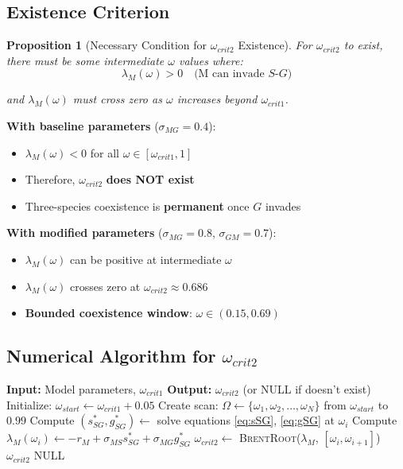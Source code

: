 \documentclass[11pt]{article}
\newtheorem{proposition}{Proposition}
\begin{document}
\subsection{Existence Criterion}

\begin{proposition}[Necessary Condition for $\omega_{crit2}$ Existence]
For $\omega_{crit2}$ to exist, there must be some intermediate $\omega$ values where:
\begin{equation}
\lambda_M(\omega) > 0 \quad \text{(M can invade $S$-$G$)}
\end{equation}

and $\lambda_M(\omega)$ must cross zero as $\omega$ increases beyond $\omega_{crit1}$.
\end{proposition}

\textbf{With baseline parameters} ($\sigma_{MG} = 0.4$):
\begin{itemize}
    \item $\lambda_M(\omega) < 0$ for all $\omega \in [\omega_{crit1}, 1]$
    \item Therefore, $\omega_{crit2}$ \textbf{does NOT exist}
    \item Three-species coexistence is \textbf{permanent} once $G$ invades
\end{itemize}

\textbf{With modified parameters} ($\sigma_{MG} = 0.8$, $\sigma_{GM} = 0.7$):
\begin{itemize}
    \item $\lambda_M(\omega)$ can be positive at intermediate $\omega$
    \item $\lambda_M(\omega)$ crosses zero at $\omega_{crit2} \approx 0.686$
    \item \textbf{Bounded coexistence window}: $\omega \in (0.15, 0.69)$
\end{itemize}

\subsection{Numerical Algorithm for $\omega_{crit2}$}

\begin{algorithm}
\caption{Compute $\omega_{crit2}$ via Root-Finding}
\begin{algorithmic}[1]
\State \textbf{Input:} Model parameters, $\omega_{crit1}$
\State \textbf{Output:} $\omega_{crit2}$ (or NULL if doesn't exist)
\State
\State Initialize: $\omega_{start} \gets \omega_{crit1} + 0.05$
\State Create scan: $\Omega \gets \{\omega_1, \omega_2, \ldots, \omega_N\}$ from $\omega_{start}$ to $0.99$
\State
{}
    \State Compute $(s^*_{SG}, g^*_{SG}) \gets$ solve equations \eqref{eq:sSG}, \eqref{eq:gSG} at $\omega_i$
    \State Compute $\lambda_M(\omega_i) \gets -r_M + \sigma_{MS} s^*_{SG} + \sigma_{MG} g^*_{SG}$
\EndFor
\State
{}
        \State $\omega_{crit2} \gets$ \textsc{BrentRoot}($\lambda_M$, $[\omega_i, \omega_{i+1}]$)
        \State \Return $\omega_{crit2}$
    \EndIf
\EndFor
\State
\State \Return NULL 
\end{algorithmic}
\end{algorithm}
\end{document}
